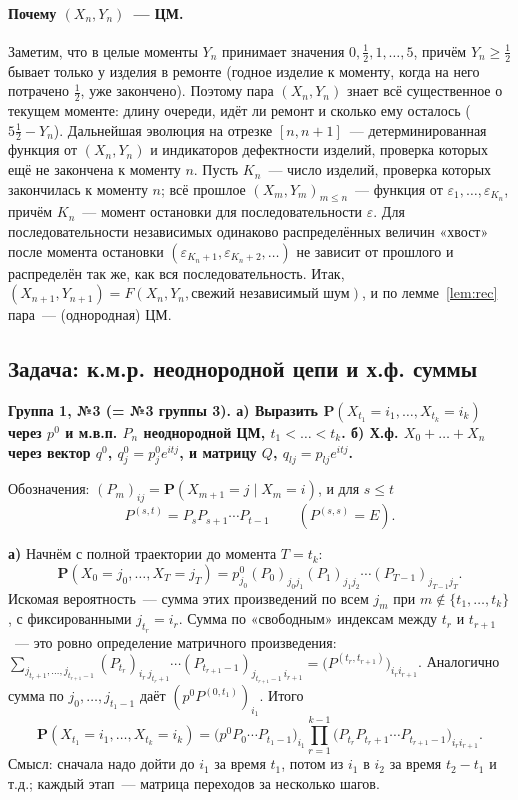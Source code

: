 \documentclass[11pt,a4paper]{article}
\theoremstyle{definition}
\newcommand{\PP}{\mathbf P}
\newcommand{\1}{\mathbf 1}
\newenvironment{task}[1]{\par\medskip\noindent\colorbox{black!7}{\parbox{\dimexpr\linewidth-2\fboxsep}{\textbf{#1}}}\par\smallskip}{\par}
\begin{document}
\paragraph{Почему $(X_n,Y_n)$~--- ЦМ.} Заметим, что в целые моменты $Y_n$
принимает значения $0,\frac12,1,\dots,5$, причём $Y_n\ge\frac12$ бывает
только у изделия в ремонте (годное изделие к моменту, когда на него потрачено
$\frac12$, уже закончено). Поэтому пара $(X_n,Y_n)$ знает всё существенное о
текущем моменте: длину очереди, идёт ли ремонт и сколько ему осталось
($5\frac12-Y_n$). Дальнейшая эволюция на отрезке $[n,n+1]$~--- детерминированная
функция от $(X_n,Y_n)$ и индикаторов дефектности изделий, проверка которых
ещё не закончена к моменту $n$. Пусть $K_n$~--- число изделий, проверка
которых закончилась к моменту $n$; всё прошлое $(X_m,Y_m)_{m\le n}$~---
функция от $\varepsilon_1,\dots,\varepsilon_{K_n}$, причём $K_n$~--- момент
остановки для последовательности $\varepsilon$. Для последовательности
независимых одинаково распределённых величин «хвост» после момента остановки
$(\varepsilon_{K_n+1},\varepsilon_{K_n+2},\dots)$ не зависит от прошлого и
распределён так же, как вся последовательность. Итак,
$(X_{n+1},Y_{n+1})=F(X_n,Y_n,\text{свежий независимый шум})$, и по
лемме~\ref{lem:rec} пара~--- (однородная) ЦМ.

\subsection{Задача: к.м.р. неоднородной цепи и х.ф. суммы}\label{z:inhom}

\begin{task}{Группа 1, №3 (= №3 группы 3). а) Выразить
$\PP(X_{t_1}=i_1,\dots,X_{t_k}=i_k)$ через $p^0$ и м.в.п. $P_n$ неоднородной
ЦМ, $t_1<\dots<t_k$. б) Х.ф. $X_0+\dots+X_n$ через вектор $q^0$,
$q^0_j=p^0_je^{itj}$, и матрицу $Q$, $q_{lj}=p_{lj}e^{itj}$.}
\end{task}

Обозначения: $(P_m)_{ij}=\PP(X_{m+1}=j\mid X_m=i)$, и для $s\le t$
\[
P^{(s,t)}=P_sP_{s+1}\cdots P_{t-1}\qquad(P^{(s,s)}=E).
\]

\textbf{а)} Начнём с полной траектории до момента $T=t_k$:
\[
\PP(X_0=j_0,\dots,X_T=j_T)=p^0_{j_0}(P_0)_{j_0j_1}(P_1)_{j_1j_2}\cdots(P_{T-1})_{j_{T-1}j_T}.
\]
Искомая вероятность~--- сумма этих произведений по всем $j_m$ при
$m\notin\{t_1,\dots,t_k\}$, с фиксированными $j_{t_r}=i_r$. Сумма по
«свободным» индексам между $t_r$ и $t_{r+1}$~--- это ровно определение
матричного произведения:
$\sum_{j_{t_r+1},\dots,j_{t_{r+1}-1}}(P_{t_r})_{i_r\,j_{t_r+1}}\cdots(P_{t_{r+1}-1})_{j_{t_{r+1}-1}\,i_{r+1}}
=\bigl(P^{(t_r,t_{r+1})}\bigr)_{i_ri_{r+1}}$.
Аналогично сумма по $j_0,\dots,j_{t_1-1}$ даёт $(p^0P^{(0,t_1)})_{i_1}$. Итого
\[
\boxed{\PP(X_{t_1}=i_1,\dots,X_{t_k}=i_k)=
\bigl(p^0P_0\cdots P_{t_1-1}\bigr)_{i_1}\prod_{r=1}^{k-1}
\bigl(P_{t_r}P_{t_r+1}\cdots P_{t_{r+1}-1}\bigr)_{i_ri_{r+1}} .}
\]
Смысл: сначала надо дойти до $i_1$ за время $t_1$, потом из $i_1$ в $i_2$ за
время $t_2-t_1$ и т.д.; каждый этап~--- матрица переходов за несколько шагов.
\end{document}
